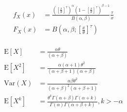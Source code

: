 \documentclass[12pt, titlepage,french]{article}
\begin{document}
\begin{distributions}
\begin{definitionNOHFILLsub}[Fonctions]
\begin{align*}
	f_{X}(x)
	&=	\frac{\left(\left[\frac{x}{\theta}\right]^{\tau}\right)^{\alpha} \left(1 - \left[\frac{x}{\theta}\right]^{\tau}\right)^{\beta - 1}}{B(\alpha, \beta)}\frac{\tau}{x}	\\
	F_{X}(x)
	&=	B\left(\alpha, \beta; \left[\frac{x}{\theta}\right]^{\tau}\right)	\\
\end{align*}
\end{definitionNOHFILLsub}

\begin{definitionNOHFILLsub}[Moments]
\begin{align*}
	\text{E}[X]
	&=	\frac{\alpha \theta}{(\alpha + \beta)}	\\
	\text{E}[X^{2}]
	&=	\frac{\alpha (\alpha + 1) \theta^{2}}{(\alpha + \beta + 1)(\alpha + \beta )}	\\
	\text{Var}(X)
	&=	\frac{\alpha \beta \theta^{2}}{(\alpha + \beta )^{2}(\alpha + \beta + 1)}	\\
	\text{E}[X^{k}]
	&=	\frac{\theta^{k} \Gamma(\alpha + \beta) \Gamma(\alpha + k)}{\Gamma(\alpha) \Gamma(\alpha + \beta + k)}, k > -\alpha
\end{align*}
\end{definitionNOHFILLsub}
\end{distributions}
\end{document}
